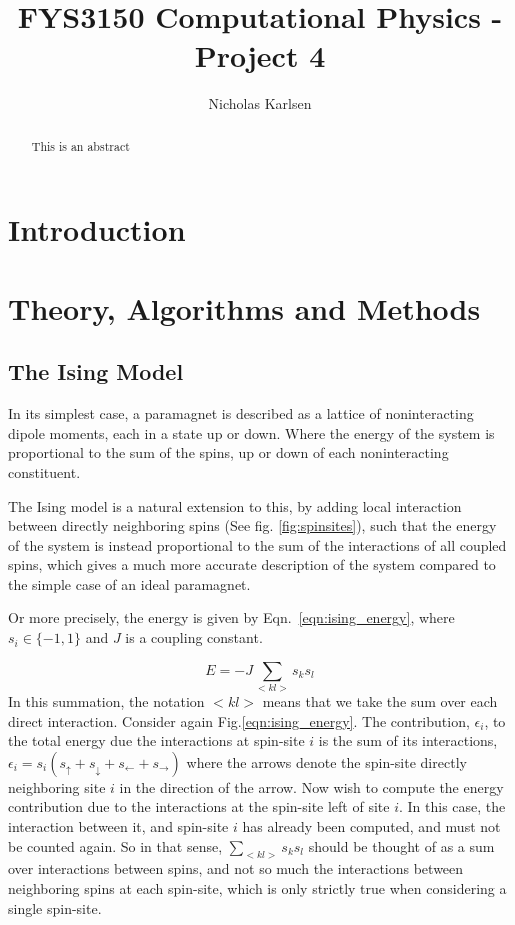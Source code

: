 \documentclass[10pt,showpacs,preprintnumbers,amsmath,amssymb,nofootinbib,aps,prl,twocolumn,groupedaddress,superscriptaddress,showkeys]{revtex4-1}
\begin{document}
\title{FYS3150 Computational Physics - Project 4}
\author{Nicholas Karlsen}


\begin{abstract}
  This is an abstract
\end{abstract}

\maketitle


\section{Introduction}
\section{Theory, Algorithms and Methods}
  \subsection{The Ising Model}
    In its simplest case, a paramagnet is described as a lattice of noninteracting dipole moments, each in a state up or down. Where the energy of the system is proportional to the sum of the spins, up or down of each noninteracting constituent.

    The Ising model is a natural extension to this, by adding local interaction between directly neighboring spins (See fig. \ref{fig:spinsites}), such that the energy of the system is instead proportional to the sum of the interactions of all coupled spins, which gives a much more accurate description of the system compared to the simple case of an ideal paramagnet.

    Or more precisely, the energy is given by Eqn.~\ref{eqn:ising_energy}, where $s_i \in \{-1, 1\}$ and $J$ is a coupling constant.

    \begin{equation}
      E = -J\sum_{<kl>} s_ks_l
      \label{eqn:ising_energy}
    \end{equation}
    In this summation, the notation $<kl>$ means that we take the sum over each direct interaction. Consider again Fig.\ref{eqn:ising_energy}. The contribution, $\epsilon_i$, to the total energy due the interactions at spin-site $i$ is the sum of its interactions, $\epsilon_i = s_i(s_\uparrow + s_\downarrow + s_\leftarrow + s_\rightarrow)$ where the arrows denote the spin-site directly neighboring site $i$ in the direction of the arrow. Now wish to compute the energy contribution due to the interactions at the spin-site left of site $i$. In this case, the interaction between it, and spin-site $i$ has already been computed, and must not be counted again. So in that sense, $\sum_{<kl>}s_ks_l$ should be thought of as a sum over interactions between spins, and not so much the interactions between neighboring spins at each spin-site, which is only strictly true when considering a single spin-site. 
\end{document}
